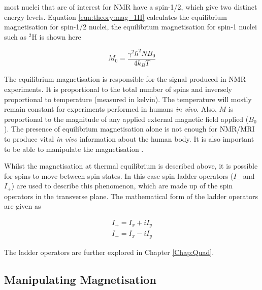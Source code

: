 \noindent most nuclei that are of interest for \ac{NMR} have a spin-1/2, which give two distinct energy levels. Equation \ref{eqn:theory:mag_1H} calculates the equilibrium magnetisation for spin-1/2 nuclei, the equilibrium magnetisation for spin-1 nuclei such as $^2$H is shown here

\begin{equation}
    M_0 = \frac{\gamma^2 \hbar^2 N B_0}{4k_BT}
    \label{eqn:theory:mag_1H}
\end{equation}

The equilibrium magnetisation is responsible for the signal produced in \ac{NMR} experiments. It is proportional to the total number of spins and inversely proportional to temperature (measured in kelvin). The temperature will mostly remain constant for experiments performed in humans \textit{in vivo}. Also, $M$ is proportional to the magnitude of any applied external magnetic field applied ($B_0$). The presence of equilibrium magnetisation alone is not enough for \ac{NMR}/\ac{MRI} to produce vital \textit{in vivo} information about the human body. It is also important to be able to manipulate the magnetisation \cite{Haacke2014MagneticDesign}. 

Whilst the magnetisation at thermal equilibrium is described above, it is possible for spins to move between spin states. In this case spin ladder operators ($I_-$ and $I_+$) are used to describe this phenomenon, which are made up of the spin operators in the transverse plane. The mathematical form of the ladder operators are given as

\begin{equation}
    \begin{gathered}
        I_+ = I_x + iI_y \\
        I_- = I_x - iI_y  
    \end{gathered}    
    \label{eqn:theory:ladder}
\end{equation}

The ladder operators are further explored in Chapter \ref{Chap:Quad}.

\subsection{Manipulating Magnetisation}

\label{Chap:Theory:Magnetisation}

